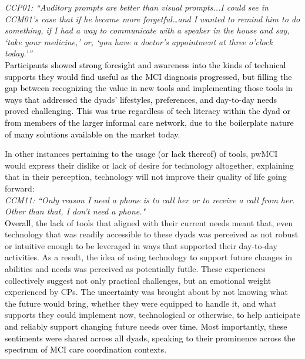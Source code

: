 \documentclass[acmsmall]{acmart}
\begin{document}
\textit{CCP01: “Auditory prompts are better than visual prompts...I could see in CCM01's case that if he became more forgetful…and I wanted to remind him to do something, if I had a way to communicate with a speaker in the house and say, ‘take your medicine,’ or, ‘you have a doctor's appointment at three o'clock today.\textcolor{black}{'}”}
\\

\textcolor{black}{Participants showed strong foresight and awareness into the kinds of technical supports they would find useful as the MCI diagnosis progressed, but filling the gap between recognizing the value in new tools and implementing those tools in ways that addressed the dyads' lifestyles, preferences, and day-to-day needs proved challenging. This was true regardless of tech literacy within the dyad or from members of the larger informal care network, due to the boilerplate nature of many solutions available on the market today.}

In other instances \textcolor{black}{pertaining to the usage (or lack thereof) of tools,} pwMCI would express their dislike or lack of desire for technology altogether, explaining that in their perception, technology will not improve their quality of life going forward:
\\

\textit{CCM11: “Only reason I need a phone is to call her or to receive a call from her. Other than that, I don't need a phone."}
\\

\textcolor{black}{Overall,} the lack of tools that aligned with their current needs meant that, even  technology that was readily accessible to these dyads was perceived as not robust or intuitive enough to be leveraged in ways that supported their day-to-day \textcolor{black}{activities}. As a result, the idea of using  technology to support future changes in abilities and needs was perceived as potentially futile. These experiences collectively suggest not only practical challenges, but an emotional weight experienced by CPs. \textcolor{black}{The uncertainty} was brought about by not knowing what the future would bring, whether they were equipped to handle it, and what supports they could implement now, technological or otherwise, \textcolor{black}{to} help anticipate \textcolor{black}{and reliably support changing} future needs \textcolor{black}{over time. Most importantly, these sentiments were shared across all dyads, speaking to their prominence across the spectrum of MCI care coordination contexts}. 
\end{document}
